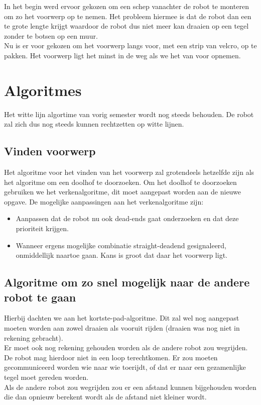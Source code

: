 \documentclass[tt1]{penoverslag}
\begin{document}
In het begin werd ervoor gekozen om een schep vanachter de robot te monteren om zo het voorwerp op te nemen. Het probleem hiermee is dat de robot dan een te grote lengte krijgt waardoor de robot dus niet meer kan draaien op een tegel zonder te botsen op een muur. \\

Nu is er voor gekozen om het voorwerp langs voor, met een strip van velcro, op te pakken. Het voorwerp ligt het minst in de weg als we het van voor opnemen.




\section{Algoritmes}

Het witte lijn algortime van vorig semester wordt nog steeds behouden. De robot zal zich  dus nog steeds kunnen rechtzetten op witte lijnen.

\subsection{Vinden voorwerp}

Het algoritme voor het vinden van het voorwerp zal grotendeels hetzelfde zijn als het algoritme om een doolhof te doorzoeken. Om het doolhof te doorzoeken gebruiken we het verkenalgoritme, dit moet aangepast worden aan de nieuwe opgave. De mogelijke aanpassingen aan het verkenalgoritme zijn:
\begin{itemize}
\item Aanpassen dat de robot nu ook dead-ends gaat onderzoeken en dat deze prioriteit krijgen.
\item Wanneer ergens mogelijke combinatie straight-deadend gesignaleerd, onmiddellijk naartoe gaan. Kans is groot dat daar het voorwerp ligt.\\
\end{itemize}

\subsection*{Algoritme om zo snel mogelijk naar de andere robot te gaan}
Hierbij dachten we aan het kortste-pad-algoritme. Dit zal wel nog aangepast moeten worden aan zowel draaien als vooruit rijden (draaien was nog niet in rekening gebracht).\\ Er moet ook nog rekening gehouden worden als de andere robot zou wegrijden. De robot mag hierdoor niet in een loop terechtkomen. Er zou moeten gecommuniceerd worden wie naar wie toerijdt, of dat er naar een gezamenlijke tegel moet gereden worden. \\
Als de andere robot zou wegrijden zou er een afstand kunnen bijgehouden worden die dan opnieuw berekent wordt als de afstand niet kleiner wordt.
\end{document}
